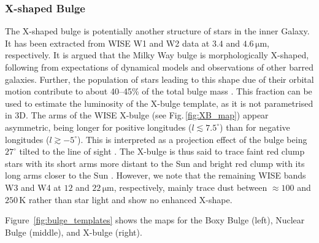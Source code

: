 \documentclass[doublespace,nopageskip]{VTthesis} %
\newcommand{\mrm}[1]{\mathrm{#1}}
\begin{document}
\subsubsection{X-shaped Bulge}

The X-shaped bulge \citep{2016AJ....152...14N} is potentially another structure of stars in the inner Galaxy. It has been extracted from WISE W1 and W2 data at $3.4$ and $4.6\,\mrm{\mu m}$, respectively.
%
It is argued that the Milky Way bulge is morphologically X-shaped, following from expectations of dynamical models and observations of other barred galaxies.
%
Further, the population of stars leading to this shape due of their orbital motion contribute to about 40--45\% of the total bulge mass \citep{Portail2015_MilkyWayorbots_Xbulge}.
%
This fraction can be used to estimate the luminosity of the X-bulge template, as it is not parametrised in 3D.
%
The arms of the WISE X-bulge (see Fig.\,\ref{fig:XB_map}) appear asymmetric, being longer for positive longitudes ($l \lesssim 7.5^{\circ}$) than for negative longitudes ($l \gtrsim -5^{\circ}$).
%
This is interpreted as a projection effect of the bulge being $27^{\circ}$ tilted to the line of sight \citep{Wegg2013_bulgebar}.
%
The X-bulge is thus said to trace faint red clump stars with its short arms more distant to the Sun and bright red clump with its long arms closer to the Sun \cite[][cf. discussion about the `double red clump' of the Milky Way]{Lee2018_DoubleRedClump}.
%
However, we note that the remaining WISE bands W3 and W4 at $12$ and $22\,\mrm{\mu m}$, respectively, mainly trace dust between $\approx 100$ and $250\,\mrm{K}$ rather than star light and show no enhanced X-shape.

Figure~\ref{fig:bulge_templates} shows the maps for the Boxy Bulge (left), Nuclear Bulge (middle), and X-bulge (right).
\end{document}
